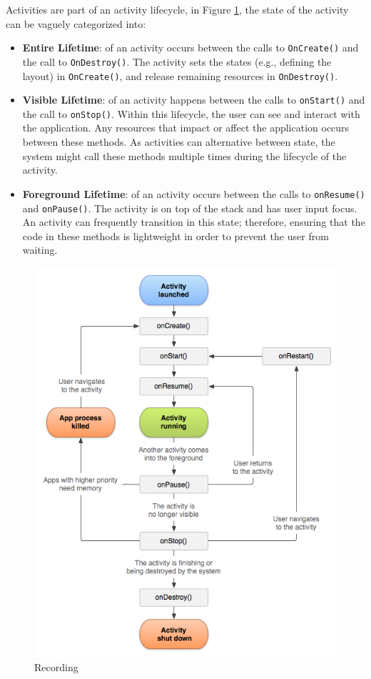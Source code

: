 Activities are part of an activity lifecycle, in Figure \ref{fig:lifecycle}, the state of the activity can be vaguely categorized into:
\begin{itemize}
    \item \textbf{Entire Lifetime}: of an activity occurs between the calls to \verb|OnCreate()| and the call to \verb|OnDestroy()|. The activity sets the states (e.g., defining the layout) in \verb|OnCreate()|, and release remaining resources in \verb|OnDestroy()|.
    \item \textbf{Visible Lifetime}: of an activity happens between the calls to \verb|onStart()| and the call to \verb|onStop()|. Within this lifecycle, the user can see and interact with the application. Any resources that impact or affect the application occurs between these methods. As activities can alternative between state, the system might call these methods multiple times during the lifecycle of the activity.
    \item \textbf{Foreground Lifetime}: of an activity occurs between the calls to \verb|onResume()| and \verb|onPause()|. The activity is on top of the stack and has user input focus. An activity can frequently transition in this state; therefore, ensuring that the code in these methods is lightweight in order to prevent the user from waiting. 
\end{itemize} 

\begin{figure}
    \centering
    \includegraphics[scale=0.6]{images/androidlifecycle.png}
    \caption{Recording}
    \label{fig:lifecycle}
\end{figure}

